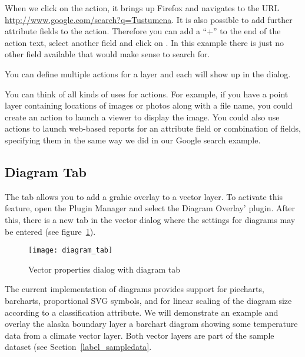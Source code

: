 When we click on the action, it brings up Firefox and navigates to the URL
\url{http://www.google.com/search?q=Tustumena}. It is also possible to add further
attribute fields to the action. Therefore you can add a ``+'' to the end of the action
text, select another field and click on . In this example there
is just no other field available that would make sense to search for.

You can define multiple actions for a layer and each will show up in the
 dialog.

You can think of all kinds of uses for actions. For example, if you have a point layer
containing locations of images or photos along with a file name, you could
create an action to launch a viewer to display the image. You could also use
actions to launch web-based reports for an attribute field or combination of
fields, specifying them in the same way we did in our Google search example.

\subsection{Diagram Tab}\label{sec:diagram}

The  tab allows you to add a grahic overlay to a vector layer.
To activate this feature, open the Plugin Manager and select the Diagram Overlay'
plugin. After this, there is a new tab in the vector  dialog where the settings for diagrams may be entered (see
figure~\ref{fig:diagramtab}).

\begin{figure}[ht]
   \centering
   \texttt{[image: diagram\_tab]}
   \caption{Vector properties dialog with diagram tab \nixcaption}\label{fig:diagramtab}
\end{figure}

The current implementation of diagrams provides support for piecharts, barcharts,
proportional SVG symbols, and for linear scaling of the diagram size according
to a classification attribute. We will demonstrate an example and overlay the
alaska boundary layer a barchart diagram showing some temperature data from
a climate vector layer. Both vector layers are part of the \qg sample dataset (see
Section~\ref{label_sampledata}.

